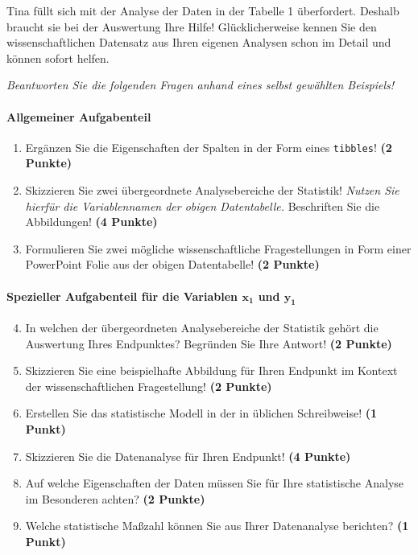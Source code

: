 \documentclass[a4paper, 9pt]{scrartcl}\usepackage[]{graphicx}\usepackage[]{xcolor}
\begin{document}
Tina füllt sich mit der Analyse der Daten in der Tabelle 1 überfordert. Deshalb braucht sie bei der Auswertung Ihre Hilfe! Glücklicherweise kennen Sie den wissenschaftlichen Datensatz aus Ihren eigenen Analysen schon im Detail und können sofort helfen.

\begin{graybox}{}
\textit{Beantworten Sie die folgenden Fragen anhand eines selbst gewählten Beispiels!}
\end{graybox}

\paragraph{Allgemeiner Aufgabenteil} 

\begin{enumerate}
  \setcounter{enumi}{0}
  \item Ergänzen Sie die Eigenschaften der Spalten in der Form eines \texttt{tibbles}! \textbf{(2 Punkte)}
  \item Skizzieren Sie zwei übergeordnete Analysebereiche der Statistik! \textit{Nutzen Sie hierfür die Variablennamen der obigen Datentabelle.} Beschriften Sie die Abbildungen! \textbf{(4 Punkte)}
  \item Formulieren Sie zwei mögliche wissenschaftliche Fragestellungen in Form einer PowerPoint Folie aus der obigen Datentabelle! \textbf{(2 Punkte)}
\end{enumerate}

\paragraph{Spezieller Aufgabenteil für die Variablen $\boldsymbol{x_1}$ und $\boldsymbol{y_1}$}

\begin{enumerate}
  \setcounter{enumi}{3}
  \item In welchen der übergeordneten Analysebereiche der Statistik gehört die Auswertung Ihres Endpunktes? Begründen Sie Ihre Antwort! \textbf{(2 Punkte)}
  \item Skizzieren Sie eine beispielhafte Abbildung für Ihren Endpunkt im Kontext der wissenschaftlichen Fragestellung! \textbf{(2 Punkte)}
  \item Erstellen Sie das statistische Modell in der in \Rlogo üblichen Schreibweise! \textbf{(1 Punkt)}
  \item Skizzieren Sie die Datenanalyse für Ihren Endpunkt! \textbf{(4 Punkte)}
  \item Auf welche Eigenschaften der Daten müssen Sie für Ihre statistische Analyse im Besonderen achten? \textbf{(2 Punkte)}
  \item Welche statistische Maßzahl können Sie aus Ihrer Datenanalyse berichten? \textbf{(1 Punkt)}
\end{enumerate}
\end{document}
